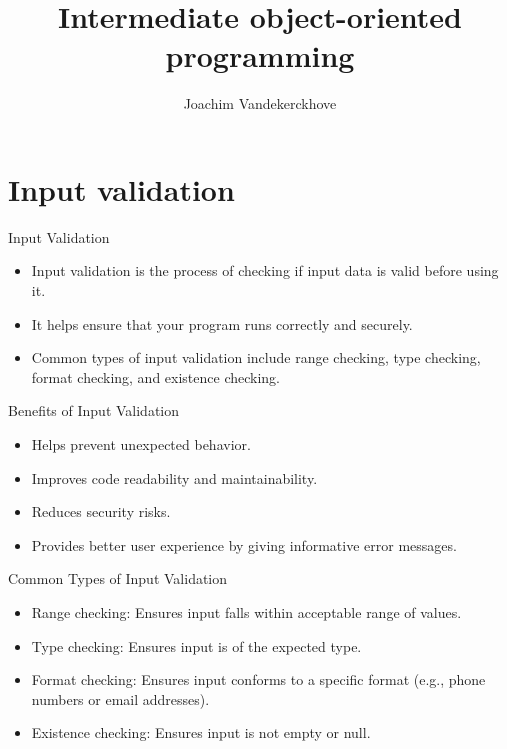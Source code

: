 \documentclass[handout]{beamer}
\title{Intermediate object-oriented programming}
\author{Joachim Vandekerckhove}
\date{}
\begin{document}
\maketitle


\section{Input validation}

\begin{frame}[fragile]{Input Validation}
    \begin{itemize}
        \item Input validation is the process of checking if input data is valid before using it.
        \item It helps ensure that your program runs correctly and securely.
        \item Common types of input validation include range checking, type checking, format checking, and existence checking.
    \end{itemize}
\end{frame}

\begin{frame}[fragile]{Benefits of Input Validation}
    \begin{itemize}
        \item Helps prevent unexpected behavior.
        \item Improves code readability and maintainability.
        \item Reduces security risks.
        \item Provides better user experience by giving informative error messages.
    \end{itemize}
\end{frame}

\begin{frame}[fragile]{Common Types of Input Validation}
    \begin{itemize}
        \item Range checking: Ensures input falls within acceptable range of values.
        \item Type checking: Ensures input is of the expected type.
        \item Format checking: Ensures input conforms to a specific format (e.g., phone numbers or email addresses).
        \item Existence checking: Ensures input is not empty or null.
    \end{itemize}
\end{frame}
\end{document}

